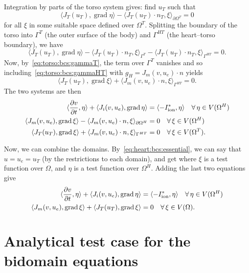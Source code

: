 \documentclass[a4paper, reqno]{amsart}
\DeclareMathOperator{\Grad}{grad}
\newcommand{\foralls}{\forall \,}
\newcommand{\inner}[2]{\langle #1, #2 \rangle}
\newcommand{\ddt}[1]{\frac{\partial #1}{\partial t}}
\numberwithin{equation}{section}
\newcommand{\heart}{\Omega^H}
\newcommand{\torso}{\Omega^T}
\begin{document}
Integration by parts of the torso system gives: find $u_T$ such that
\begin{equation}
  \inner{J_T(u_T)}{\Grad \eta} - \inner{J_T(u_T) \cdot n_T}{\xi}_{\partial \torso}
  = 0
\end{equation}
for all $\xi$ in some suitable space defined over $\torso$.
Splitting the boundary of the torso into $\Gamma^T$ (the outer surface
of the body) and $\Gamma^{HT}$ (the heart--torso boundary), we have
\begin{equation}
  \inner{J_T(u_T)}{\Grad \eta}
  - \inner{J_T(u_T) \cdot n_T}{\xi}_{\Gamma^T}
  - \inner{J_T(u_T) \cdot n_T}{\xi}_{\Gamma^{HT}}
  = 0 .
\end{equation}
Now, by~\eqref{eq:torso:bcs:gammaT}, the term over $\Gamma^T$ vanishes
and so including~\eqref{eq:torso:bcs:gammaHT} with $g_H = J_m(v, u_e)
\cdot n$ yields
\begin{equation}
  \inner{J_T(u_T)}{\Grad \xi}
  + \inner{J_m(v, u_e) \cdot n}{\xi}_{\Gamma^{HT}}
  = 0 .
\end{equation}
The two systems are then
\begin{align}
  \inner{\ddt{v}}{\eta}
  + \inner{J_i(v, u_e)}{\Grad \eta}
  &= \inner{- I^\ast_{\rm{ion}}}{\eta} \quad \foralls \eta \in V(\heart) \\
  \inner{J_m(v, u_e)}{\Grad \xi}
  - \inner{J_m(v, u_e) \cdot n}{\xi}_{\partial \heart}
  &= 0 \quad \foralls \xi \in V(\heart) \\
  \inner{J_T(u_T)}{\Grad \xi}
  + \inner{J_m(v, u_e) \cdot n}{\xi}_{\Gamma^{HT}}
  &= 0 \quad \foralls \xi \in V(\torso).
\end{align}

Now, we can combine the domains. By~\eqref{eq:heart:bcs:essential}, we
can say that $u = u_e = u_T$ (by the restrictions to each domain), and
get where $\xi$ is a test function over $\Omega$, and $\eta$ is a test
function over $\heart$. Adding the last two equations give
\begin{align}
  \inner{\ddt{v}}{\eta}
  + \inner{J_i(v, u_e)}{\Grad \eta}
  &= \inner{- I^\ast_{\rm{ion}}}{\eta} \quad \foralls \eta \in V(\heart) \\
  \inner{J_m(v, u_e)}{\Grad \xi}
  + \inner{J_T(u_T)}{\Grad \xi}
  &= 0 \quad \foralls \xi \in V(\Omega).
\end{align}

\section{Analytical test case for the bidomain equations}
\end{document}
